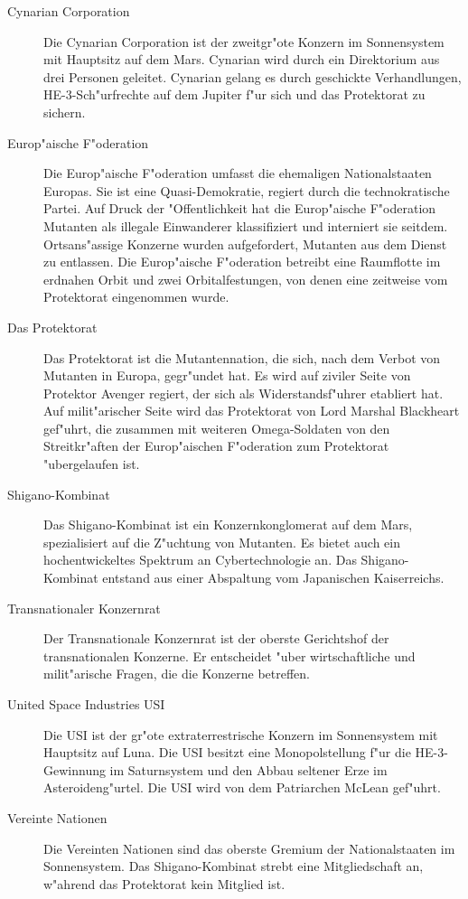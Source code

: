 
\begin{description}
\item [Cynarian Corporation] Die Cynarian Corporation ist der zweitgr"o\3te Konzern im Sonnensystem mit Hauptsitz auf dem Mars. Cynarian wird 
      durch ein Direktorium aus drei Personen geleitet. Cynarian gelang es durch geschickte Verhandlungen, HE-3-Sch"urfrechte auf dem Jupiter f"ur sich und das Protektorat zu sichern.
\item [Europ"aische F"oderation] Die Europ"aische F"oderation umfasst die ehemaligen Nationalstaaten Europas. Sie ist eine Quasi-Demokratie, 
      regiert durch die technokratische Partei. Auf Druck der "Offentlichkeit hat die Europ"aische F"oderation Mutanten als illegale Einwanderer klassifiziert und interniert sie seitdem. Ortsans"assige Konzerne wurden aufgefordert, Mutanten aus dem Dienst zu entlassen. Die Europ"aische F"oderation betreibt eine Raumflotte im erdnahen Orbit und zwei Orbitalfestungen, von denen eine zeitweise vom Protektorat eingenommen wurde.
\item [Das Protektorat] Das Protektorat ist die Mutantennation, die sich, nach dem Verbot von Mutanten in Europa, gegr"undet hat. Es wird 
      auf ziviler Seite von Protektor Avenger regiert, der sich als Widerstandsf"uhrer etabliert hat. Auf milit"arischer Seite wird das Protektorat von Lord Marshal Blackheart gef"uhrt, die zusammen mit weiteren Omega-Soldaten von den Streitkr"aften der Europ"aischen F"oderation zum Protektorat "ubergelaufen ist.
\item [Shigano-Kombinat] Das Shigano-Kombinat ist ein Konzernkonglomerat auf dem Mars, spezialisiert auf die Z"uchtung von Mutanten. Es 
      bietet auch ein hochentwickeltes Spektrum an Cybertechnologie an. Das Shigano-Kombinat entstand aus einer Abspaltung vom Japanischen Kaiserreichs.
\item [Transnationaler Konzernrat] Der Transnationale Konzernrat ist der oberste Gerichtshof der transnationalen Konzerne. Er entscheidet 
      "uber wirtschaftliche und milit"arische Fragen, die die Konzerne betreffen.
\item [United Space Industries USI] Die USI ist der gr"o\3te extraterrestrische Konzern im Sonnensystem mit Hauptsitz auf Luna. Die USI 
      besitzt eine Monopolstellung f"ur die HE-3-Gewinnung im Saturnsystem und den Abbau seltener Erze im Asteroideng"urtel. Die USI wird von dem Patriarchen McLean gef"uhrt.
\item [Vereinte Nationen] Die Vereinten Nationen sind das oberste Gremium der Nationalstaaten im Sonnensystem. Das Shigano-Kombinat strebt 
      eine Mitgliedschaft an, w"ahrend das Protektorat kein Mitglied ist.
\end{description}

